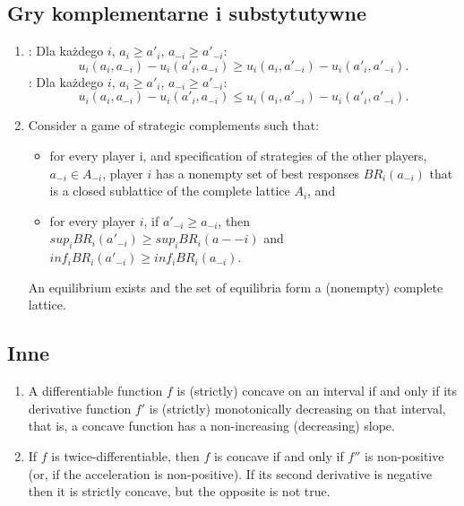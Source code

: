 \subsection{Gry komplementarne i substytutywne}
\begin{enumerate}
 \item
 	: Dla każdego $i$, $a_i \geq a'_i$, $a_{-i} \geq a'_{-i} $:
 	$$u_i(a_i, a_{-i}) - u_i(a'_i, a_{-i}) \geq  u_i(a_i, a'_{-i}) - u_i(a'_i, a'_{-i}).$$
 	: Dla każdego $i$, $a_i \geq a'_i$, $a_{-i} \geq a'_{-i} $:
 	$$u_i(a_i, a_{-i}) - u_i(a'_i, a_{-i}) \leq  u_i(a_i, a'_{-i}) - u_i(a'_i, a'_{-i}).$$
 \item Consider a game of strategic complements such that:
  \begin{itemize}
   \item for every player i, and specification of strategies of the other players, $a_{-i} \in A_{-i}$, player $i$ has a
nonempty set of best responses $BR_i(a_{-i})$ that is a closed sublattice of the complete lattice $A_i$, and
   \item for every player $i$, if $a'_{-i} \geq a_{-i}$, then $sup_{i} BR_{i}(a'_{-i}) \geq sup_{i} BR_{i}(a-{-i})$ and $inf_i BR_i(a'_{-i}) \geq inf_i BR_i(a_{-i})$.
  \end{itemize}
  An equilibrium exists and the set of equilibria form a (nonempty) complete lattice.
\end{enumerate}

\subsection{Inne}
\begin{enumerate}
 \item  A differentiable function $f$ is (strictly) concave on an interval if and only if its derivative function $f'$ is (strictly) monotonically decreasing on that interval, that is, a concave function has a non-increasing (decreasing) slope.
 \item If $f$ is twice-differentiable, then $f$ is concave if and only if $f''$ is non-positive (or, if the acceleration is non-positive). If its second derivative is negative then it is strictly concave, but the opposite is not true.
\end{enumerate}

